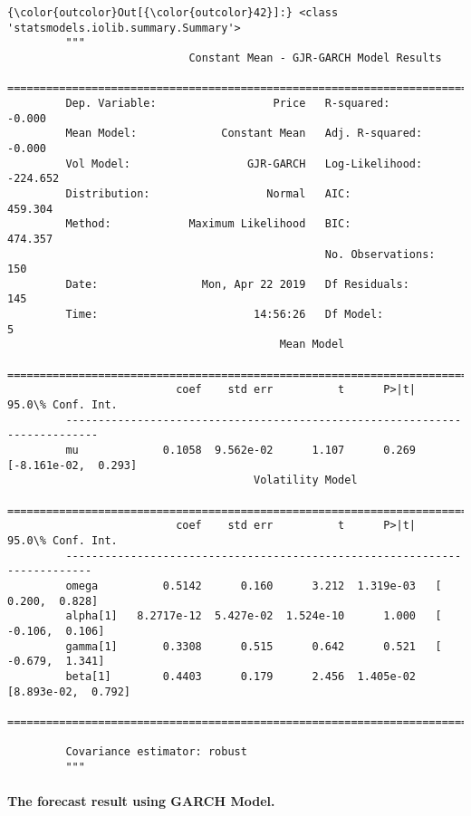 \documentclass[11pt]{article}
\begin{document}
\begin{Verbatim}[commandchars=\\\{\}]
{\color{outcolor}Out[{\color{outcolor}42}]:} <class 'statsmodels.iolib.summary.Summary'>
         """
                            Constant Mean - GJR-GARCH Model Results                    
         ==============================================================================
         Dep. Variable:                  Price   R-squared:                      -0.000
         Mean Model:             Constant Mean   Adj. R-squared:                 -0.000
         Vol Model:                  GJR-GARCH   Log-Likelihood:               -224.652
         Distribution:                  Normal   AIC:                           459.304
         Method:            Maximum Likelihood   BIC:                           474.357
                                                 No. Observations:                  150
         Date:                Mon, Apr 22 2019   Df Residuals:                      145
         Time:                        14:56:26   Df Model:                            5
                                          Mean Model                                
         ===========================================================================
                          coef    std err          t      P>|t|     95.0\% Conf. Int.
         ---------------------------------------------------------------------------
         mu             0.1058  9.562e-02      1.107      0.269 [-8.161e-02,  0.293]
                                      Volatility Model                             
         ==========================================================================
                          coef    std err          t      P>|t|    95.0\% Conf. Int.
         --------------------------------------------------------------------------
         omega          0.5142      0.160      3.212  1.319e-03   [  0.200,  0.828]
         alpha[1]   8.2717e-12  5.427e-02  1.524e-10      1.000   [ -0.106,  0.106]
         gamma[1]       0.3308      0.515      0.642      0.521   [ -0.679,  1.341]
         beta[1]        0.4403      0.179      2.456  1.405e-02 [8.893e-02,  0.792]
         ==========================================================================
         
         Covariance estimator: robust
         """
\end{Verbatim}
            
    \paragraph{The forecast result using GARCH
Model.}\label{the-forecast-result-using-garch-model.}
\end{document}
